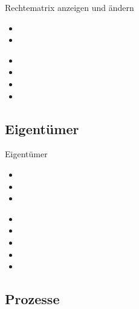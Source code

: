 \documentclass[aspectratio=43]{beamer}
\begin{document}
\begin{frame} 
	\begin{block}{Rechtematrix anzeigen und ändern}
	\begin{itemize}
	\item {}
	\item {}
	\end{itemize}
	\end{block}
	\begin{exampleblock}{}
	\begin{itemize}
	\item {}
	\item {}
	\item {}
	\item {}
	\end{itemize}
	\end{exampleblock}
\end{frame}

\subsection{Eigentümer}
\begin{frame} 
	\begin{block}{Eigentümer}
	\begin{itemize}
	\item {}
	\item {}
	\item {}
	\end{itemize}
	\end{block}
	\begin{exampleblock}{}
	\begin{itemize}
	\item {}
	\item {}
	\item {}
	\item {}
	\item {}
	\end{itemize}
	\end{exampleblock}
\end{frame}
\subsection{Prozesse}
\end{document}

